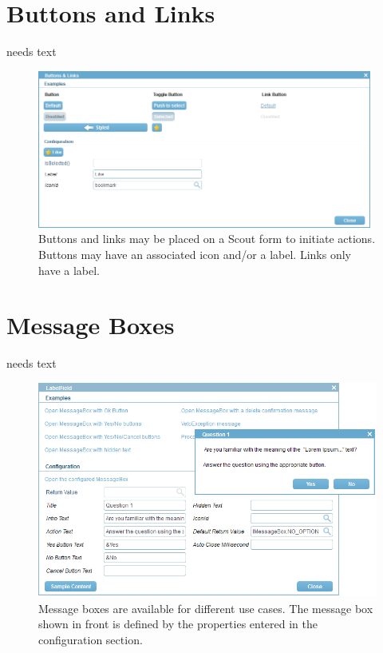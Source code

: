 \documentclass[a4paper,10pt,twoside]{book}
\begin{document}
\section{Buttons and Links}
needs text

\begin{figure}
\includegraphics[width=11cm]{buttonlink.png}
\caption{Buttons and links may be placed on a Scout form to initiate actions.
Buttons may have an associated icon and/or a label.
Links only have a label.}
\end{figure}

\section{Message Boxes}
needs text

\begin{figure}
\includegraphics[width=14cm]{messagebox.png}
\caption{Message boxes are available for different use cases.
The message box shown in front is defined by the properties entered in the configuration section.}
\end{figure}
\end{document}
